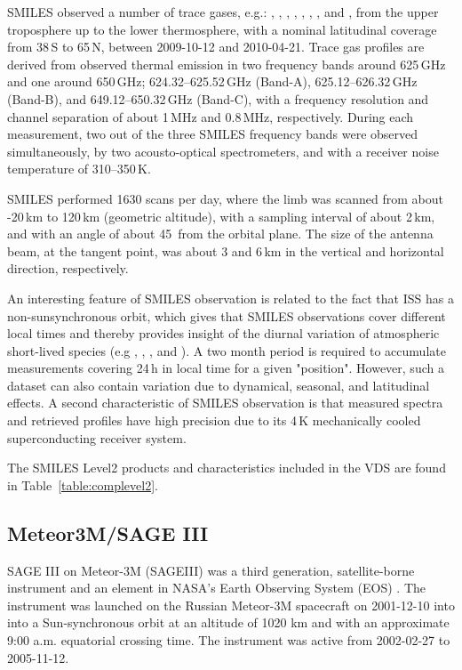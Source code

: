 SMILES observed a number of trace gases, e.g.: , , 
, , , , , and , 
from the upper troposphere up to the lower thermosphere,  
with a nominal latitudinal coverage 
from 38\degree\,S to 65\degree\,N, between 2009-10-12 and 2010-04-21.
Trace gas profiles are derived from observed thermal emission in two frequency
bands around 625\,GHz and one around 650\,GHz;
624.32--625.52\,GHz (Band-A), 625.12--626.32\,GHz (Band-B),
and 649.12--650.32\,GHz (Band-C), with a frequency resolution
and channel separation of about 1\,MHz and 0.8\,MHz, 
respectively.  
During each measurement, two out of the three SMILES frequency
bands were observed simultaneously, by two acousto-optical spectrometers,
and with a receiver noise temperature of 310--350\,K.

SMILES performed 1630 scans per day, where the limb was scanned
from about -20\,km to 120\,km (geometric altitude), 
with a sampling interval of about 2\,km, and with an angle of 
about 45\degree\ from the orbital plane. The size of the antenna beam, 
at the tangent point, was about 3 and 6\,km in the vertical and 
horizontal direction, respectively. 

An interesting feature of SMILES observation is related to the fact
that ISS has a non-sunsynchronous orbit, which gives that SMILES 
observations cover different local times and thereby provides insight
of the diurnal variation of atmospheric short-lived species
(e.g , , , and ). 
A two month period is required to accumulate measurements covering 
24\,h in local time for a given "position". However, such a 
dataset can also contain variation due to dynamical, seasonal, and 
latitudinal effects.
A second characteristic of SMILES observation is that 
measured spectra and retrieved profiles have high precision due 
to its 4\,K mechanically cooled superconducting receiver system.

The SMILES Level2 products and characteristics included in the
VDS are found in Table~\ref{table:complevel2}.


\subsection{Meteor3M/SAGE III}

SAGE III on Meteor-3M (SAGEIII) was a third generation, satellite-borne
instrument and an element in NASA's Earth Observing System (EOS) \citep{SAGEIII_DPUG}. 
The instrument was launched on the Russian Meteor-3M spacecraft on 2001-12-10
into into a Sun-synchronous orbit at an altitude of 1020 km and with an
approximate 9:00 a.m. equatorial crossing time.  The instrument was active from
2002-02-27 to 2005-11-12.

